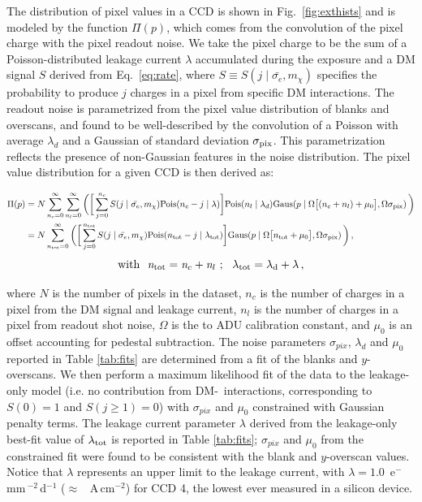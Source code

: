 \documentclass[aps,amsmath,amssymb,twocolumn,superscriptaddress,nofootinbib]{revtex4-1}
\begin{document}
The distribution of pixel values in a CCD is shown in Fig.~\ref{fig:exthists} and is modeled by the function $\Pi(p)$, which comes from the convolution of the pixel charge with the pixel readout noise. We take the pixel charge to be the sum of a Poisson-distributed leakage current $\lambda$ accumulated during the exposure and a DM signal $S$ derived from Eq.~\ref{eq:rate}, where $S \equiv S(j \mid \bar{\sigma_e}, m_\chi)$ specifies the probability to produce $j$ charges in a pixel from specific DM interactions. The readout noise is parametrized from the pixel value distribution of blanks and overscans, and found to be well-described by the convolution of a Poisson with average $\lambda_{d}$ and a Gaussian of standard deviation $\sigma_{\rm pix}$. This parametrization reflects the presence of non-Gaussian features in the noise distribution. The pixel value distribution for a given CCD is then derived as:
\begin{widetext}
\begin{align} \label{eq:pixdist}
\begin{split}
\Pi(p) &= N \sum_{n_c=0}^{\infty} \sum_{n_l=0}^{\infty}\bigg( \bigg[ \sum_{j=0}^{n_c} S(j \mid \bar{\sigma_e}, m_\chi) \textnormal{Pois}(n_c-j \mid \lambda) \bigg] \textnormal{Pois}(n_l \mid \lambda_{d}) \textnormal{Gaus}(p \mid \Omega \big[(n_c + n_l) + \mu_0 \big], \Omega \sigma_{\rm pix})\, \bigg) \\
&= N \sum_{n_{\rm tot}=0}^{\infty}  \bigg( \bigg[ \sum_{j=0}^{n_{\rm tot}} S(j \mid \bar{\sigma_e}, m_\chi) \textnormal{Pois}(n_{\rm tot}-j \mid \lambda_{\rm tot}) \bigg]  \textnormal{Gaus}(p \mid \Omega \big[n_{\rm tot} + \mu_0 \big], \Omega \sigma_{\rm pix})\, \bigg)\,,
\end{split}
\end{align}
\begin{equation} \label{eq:pixdist1}
\rm{with}~~\textit{n}_{\rm{tot}} = \textit{n$_c$}+\textit{n$_l$} ~;~~ \lambda_{\rm tot} = \lambda_d+\lambda\,,
\end{equation}
\end{widetext}
where $N$ is the number of pixels in the dataset, $n_{c}$ is the number of charges in a pixel from the DM signal and leakage current, $n_{l}$ is the number of charges in a pixel from readout shot noise, $\Omega$ is the \electron to ADU calibration constant, and $\mu_0$ is an offset accounting for pedestal subtraction.
The noise parameters $\sigma_{pix}$, $\lambda_d$ and $\mu_0$ reported in Table \ref{tab:fits} are determined from a fit of the blanks and $y$-overscans. We then perform a maximum likelihood fit of the data to the leakage-only model (i.e. no contribution from DM-\electron\ interactions, corresponding to  $S(0)=1$ and $S(j\ge1)=0$) with $\sigma_{pix}$ and $\mu_0$ constrained with Gaussian penalty terms. The leakage current parameter $\lambda$
derived from the leakage-only best-fit value of $\lambda_{\rm tot}$ is reported in Table \ref{tab:fits}; $\sigma_{pix}$ and $\mu_0$ from the constrained fit were found to be consistent with the blank and $y$-overscan values. Notice that $\lambda$ represents an upper limit to the leakage current, with $\lambda=1.0$~e$^-$mm\,$^{-2}$\,d$^{-1}$ ($\approx$ ~A\,cm$^{-2}$) for CCD 4, the lowest ever measured in a silicon device.
\end{document}
